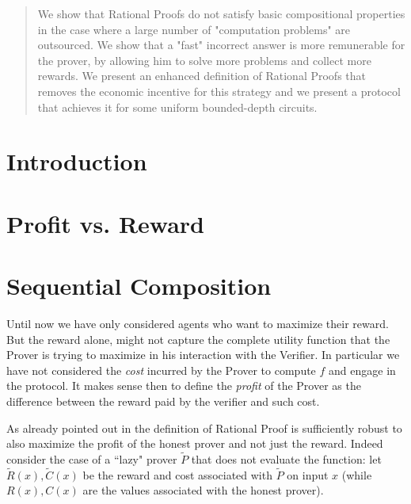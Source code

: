 \begin{abstract}
We show that Rational Proofs  do not satisfy basic compositional properties in the case where a large number of "computation problems" are outsourced. We show that a "fast" incorrect answer is more remunerable for the prover, by allowing him to solve more problems and collect more rewards.
We present an enhanced definition of Rational Proofs that removes the economic incentive  for this strategy and we present a protocol that achieves it for
some
uniform bounded-depth circuits.
\end{abstract}

%

\section{Introduction}


%

\section{Profit vs. Reward}


\section{Sequential Composition}
Until now we have only considered agents who want to maximize their reward. But the reward alone, might not capture the complete utility function that the Prover is trying to maximize in his interaction with the Verifier. In particular we have not considered the 
{\em cost} incurred by the Prover to compute $f$ and engage in the protocol. It makes 
sense then to define the  {\em profit} of the Prover as the difference between the reward paid by the verifier and such cost. 


As already pointed out in \cite{am1,ratargs} the definition of Rational Proof is sufficiently robust to also maximize the profit of the honest prover and not just the reward. Indeed consider the case of a ``lazy" prover $\tilde{P}$ that does not evaluate the function: let $\tilde{R}(x), \tilde{C}(x)$ be the reward and cost associated with $\tilde{P}$ on input $x$ (while $R(x),C(x)$ are the values associated with the honest prover). 

